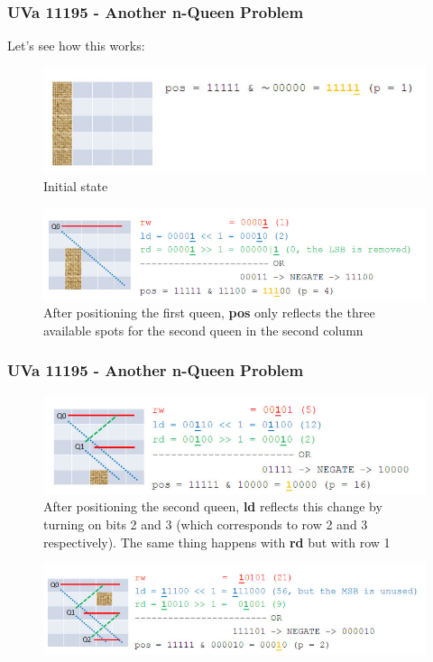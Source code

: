 \documentclass{beamer}
\begin{document}
\begin{frame}[fragile]
\frametitle{UVa 11195 - Another n-Queen Problem}

Let's see how this works:

\begin{figure}
    \centering
    \includegraphics[scale=0.6]{imgs/nqueen_0.png}
    \caption{Initial state}
\end{figure}

\begin{figure}
    \centering
    \includegraphics[scale=0.6]{imgs/nqueen_1.png}
    \caption{After positioning the first queen, \textbf{pos} only reflects the three available spots for the second queen in the second column}
\end{figure}

\end{frame}

\begin{frame}[fragile]
\frametitle{UVa 11195 - Another n-Queen Problem}

\begin{figure}
    \centering
    \includegraphics[scale=0.6]{imgs/nqueen_2.png}
    \caption{After positioning the second queen, \textbf{ld} reflects this change by turning on bits 2 and 3 (which corresponds to row 2 and 3 respectively). The same thing happens with \textbf{rd} but with row 1}
\end{figure}

\begin{figure}
    \centering
    \includegraphics[scale=0.6]{imgs/nqueen_3.png}
\end{figure}

\end{frame}
\end{document}
